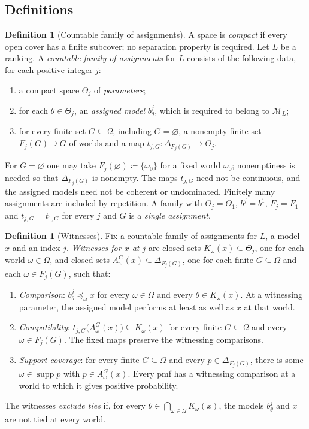 \documentclass[11pt]{article}
\theoremstyle{definition}
\newtheorem{definition}[theorem]{Definition}
\theoremstyle{remark}
\newcommand{\M}{\mathcal M}
\newcommand{\supp}{\operatorname{supp}}
\begin{document}
\subsection{Definitions}

\begin{definition}[Countable family of assignments]\label{def:family}
A space is \emph{compact} if every open cover has a finite subcover; no separation property is required. Let $L$ be a ranking. A \emph{countable family of assignments} for $L$ consists of the following data, for each positive integer $j$:
\begin{enumerate}[label=(\roman*)]
\item a compact space $\Theta_j$ of \emph{parameters};
\item for each $\theta\in\Theta_j$, an \emph{assigned model} $b^j_\theta$, which is required to belong to $\M_L$;
\item for every finite set $G\subseteq\Omega$, including $G=\varnothing$, a nonempty finite set $F_j(G)\supseteq G$ of worlds and a map $t_{j,G}:\Delta_{F_j(G)}\to\Theta_j$.
\end{enumerate}
For $G=\varnothing$ one may take $F_j(\varnothing)\coloneqq\{\omega_0\}$ for a fixed world $\omega_0$; nonemptiness is needed so that $\Delta_{F_j(G)}$ is nonempty. The maps $t_{j,G}$ need not be continuous, and the assigned models need not be coherent or undominated. Finitely many assignments are included by repetition. A family with $\Theta_j=\Theta_1$, $b^j=b^1$, $F_j=F_1$ and $t_{j,G}=t_{1,G}$ for every $j$ and $G$ is a \emph{single assignment}.
\end{definition}

\begin{definition}[Witnesses]\label{def:witnesses}
Fix a countable family of assignments for $L$, a model $x$ and an index $j$. \emph{Witnesses for $x$ at $j$} are closed sets $K_\omega(x)\subseteq\Theta_j$, one for each world $\omega\in\Omega$, and closed sets $A^G_\omega(x)\subseteq\Delta_{F_j(G)}$, one for each finite $G\subseteq\Omega$ and each $\omega\in F_j(G)$, such that:
\begin{enumerate}[label=\textbf{(W\arabic*)},leftmargin=3.2em]
\item \emph{Comparison}: $b^j_\theta\preceq_\omega x$ for every $\omega\in\Omega$ and every $\theta\in K_\omega(x)$. At a witnessing parameter, the assigned model performs at least as well as $x$ at that world.
\item \emph{Compatibility}: $t_{j,G}\bigl(A^G_\omega(x)\bigr)\subseteq K_\omega(x)$ for every finite $G\subseteq\Omega$ and every $\omega\in F_j(G)$. The fixed maps preserve the witnessing comparisons.
\item \emph{Support coverage}: for every finite $G\subseteq\Omega$ and every $p\in\Delta_{F_j(G)}$, there is some $\omega\in\supp p$ with $p\in A^G_\omega(x)$. Every pmf has a witnessing comparison at a world to which it gives positive probability.
\end{enumerate}
The witnesses \emph{exclude ties} if, for every $\theta\in\bigcap_{\omega\in\Omega}K_\omega(x)$, the models $b^j_\theta$ and $x$ are not tied at every world.
\end{definition}
\end{document}
